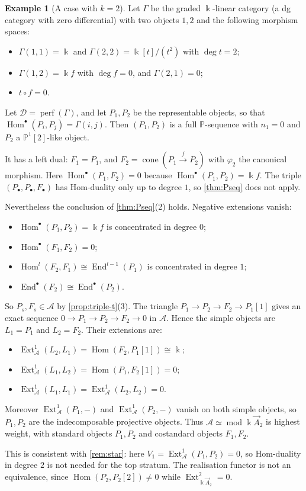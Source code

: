 \documentclass[11pt,reqno]{amsart}
\theoremstyle{plain}
\theoremstyle{definition}
\newtheorem{example}[theorem]{Example}
\theoremstyle{remark}
\newcommand{\kk}{\Bbbk}
\DeclareMathOperator{\Hom}{Hom}
\DeclareMathOperator{\End}{End}
\DeclareMathOperator{\Ext}{Ext}
\DeclareMathOperator{\cone}{cone}
\newcommand{\modd}{\operatorname{mod}}
\newcommand{\Pn}[2]{\mathbb{P}^{#1}[#2]}
\newcommand{\cD}{\mathcal{D}}
\newcommand{\cA}{\mathcal{A}}
\begin{document}
\begin{example}[A case with $k=2$]\label{ex:k2}
Let $\Gamma$ be the graded $\kk$-linear category (a dg category with zero differential) with two objects $1,2$ and the following morphism spaces:
\begin{itemize}
\item $\Gamma(1,1)=\kk$ and $\Gamma(2,2)=\kk[t]/(t^2)$ with $\deg t=2$;
\item $\Gamma(1,2)=\kk f$ with $\deg f=0$, and $\Gamma(2,1)=0$;
\item $t\circ f=0$.
\end{itemize}
Let $\cD=\operatorname{perf}(\Gamma)$, and let $P_1,P_2$ be the representable objects, so that $\Hom^\bullet(P_i,P_j)=\Gamma(i,j)$. Then $(P_1,P_2)$ is a full $\mathbb{P}$-sequence with $n_1=0$ and $P_2$ a $\Pn12$-like object.

It has a left dual: $F_1=P_1$, and $F_2=\cone(P_1\xrightarrow{f}P_2)$ with $\varphi_2$ the canonical morphism. Here $\Hom^\bullet(P_1,F_2)=0$ because $\Hom^\bullet(P_1,P_2)=\kk f$. The triple $(P_\bullet,P_\bullet,F_\bullet)$ has Hom-duality only up to degree $1$, so \cref{thm:Pseq} does not apply.

Nevertheless the conclusion of \cref{thm:Pseq}(2) holds. Negative extensions vanish:
\begin{itemize}
\item $\Hom^\bullet(P_1,P_2)=\kk f$ is concentrated in degree $0$;
\item $\Hom^\bullet(F_1,F_2)=0$;
\item $\Hom^l(F_2,F_1)\cong\End^{l-1}(P_1)$ is concentrated in degree $1$;
\item $\End^\bullet(F_2)\cong\End^\bullet(P_2)$.
\end{itemize}
So $P_s,F_s\in\cA$ by \cref{prop:triple-t}(3). The triangle $P_1\to P_2\to F_2\to P_1[1]$ gives an exact sequence $0\to P_1\to P_2\to F_2\to0$ in $\cA$. Hence the simple objects are $L_1=P_1$ and $L_2=F_2$. Their extensions are:
\begin{itemize}
\item $\Ext^1_\cA(L_2,L_1)=\Hom(F_2,P_1[1])\cong\kk$;
\item $\Ext^1_\cA(L_1,L_2)=\Hom(P_1,F_2[1])=0$;
\item $\Ext^1_\cA(L_1,L_1)=\Ext^1_\cA(L_2,L_2)=0$.
\end{itemize}
Moreover $\Ext^1_\cA(P_1,-)$ and $\Ext^1_\cA(P_2,-)$ vanish on both simple objects, so $P_1,P_2$ are the indecomposable projective objects. Thus $\cA\simeq\modd\kk\vec A_2$ is highest weight, with standard objects $P_1,P_2$ and costandard objects $F_1,F_2$.

This is consistent with \cref{rem:star}: here $V_1=\Ext^1_\cA(P_1,P_2)=0$, so Hom-duality in degree $2$ is not needed for the top stratum. The realisation functor is not an equivalence, since $\Hom(P_2,P_2[2])\ne0$ while $\Ext^2_{\kk\vec A_2}=0$.
\end{example}
\end{document}
